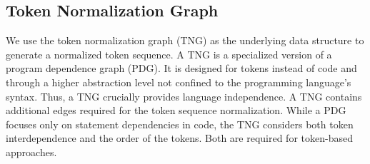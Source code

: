 \subsection{Token Normalization Graph}

We use the token normalization graph (TNG) as the underlying data structure to generate a normalized token sequence.
A TNG is a specialized version of a program dependence graph (PDG).
It is designed for tokens instead of code and through a higher abstraction level not confined to the programming language's syntax. Thus, a TNG crucially provides language independence. A TNG contains additional edges required for the token sequence normalization.
While a PDG focuses only on statement dependencies in code, the TNG considers both token interdependence and the order of the tokens. Both are required for token-based approaches.

